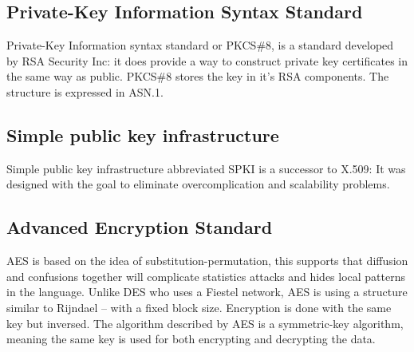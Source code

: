 \subsection{Private-Key Information Syntax Standard}
Private-Key Information syntax standard or PKCS\#8, is a standard developed by RSA Security Inc: it does provide a way to construct private key certificates in the same way as public.
PKCS\#8 stores the key in it's RSA components.
The structure is expressed in ASN.1.

\subsection{Simple public key infrastructure}
Simple public key infrastructure abbreviated SPKI is a successor to X.509:
It was designed with the goal to eliminate overcomplication and scalability problems.

\subsection{Advanced Encryption Standard}
AES is based on the idea of substitution-permutation\cite{AESISFAST:Online}, this supports that 
diffusion and confusions together will complicate statistics attacks and hides local patterns in the language. Unlike DES who uses a Fiestel network, AES is using a structure  similar to Rijndael – with a fixed block size. Encryption is done with the same key but inversed. The algorithm described by AES is a symmetric-key algorithm, meaning the same key is used for both encrypting and decrypting the data.
